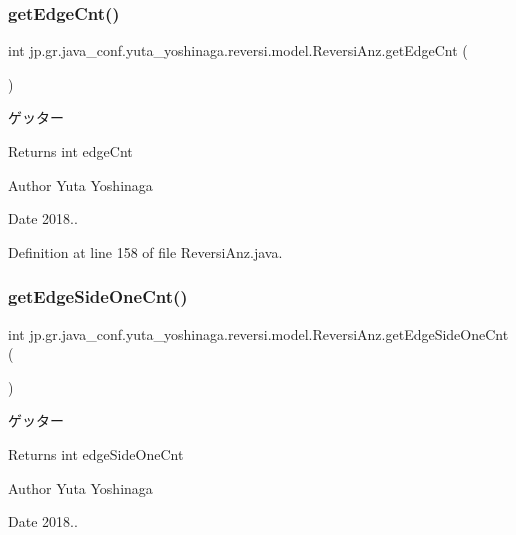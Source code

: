\subsubsection{\texorpdfstring{get\+Edge\+Cnt()}{getEdgeCnt()}}
{\footnotesize\ttfamily int jp.\+gr.\+java\+\_\+conf.\+yuta\+\_\+yoshinaga.\+reversi.\+model.\+Reversi\+Anz.\+get\+Edge\+Cnt (\begin{DoxyParamCaption}{ }\end{DoxyParamCaption})}



ゲッター 

\begin{DoxyReturn}{Returns}
int edge\+Cnt 
\end{DoxyReturn}
\begin{DoxyAuthor}{Author}
Yuta Yoshinaga 
\end{DoxyAuthor}
\begin{DoxyDate}{Date}
2018.. 
\end{DoxyDate}


Definition at line 158 of file Reversi\+Anz.\+java.

\mbox{\label{classjp_1_1gr_1_1java__conf_1_1yuta__yoshinaga_1_1reversi_1_1model_1_1_reversi_anz_a075019ae93822dc76e9db367d357c501}} 
\subsubsection{\texorpdfstring{get\+Edge\+Side\+One\+Cnt()}{getEdgeSideOneCnt()}}
{\footnotesize\ttfamily int jp.\+gr.\+java\+\_\+conf.\+yuta\+\_\+yoshinaga.\+reversi.\+model.\+Reversi\+Anz.\+get\+Edge\+Side\+One\+Cnt (\begin{DoxyParamCaption}{ }\end{DoxyParamCaption})}



ゲッター 

\begin{DoxyReturn}{Returns}
int edge\+Side\+One\+Cnt 
\end{DoxyReturn}
\begin{DoxyAuthor}{Author}
Yuta Yoshinaga 
\end{DoxyAuthor}
\begin{DoxyDate}{Date}
2018.. 
\end{DoxyDate}


